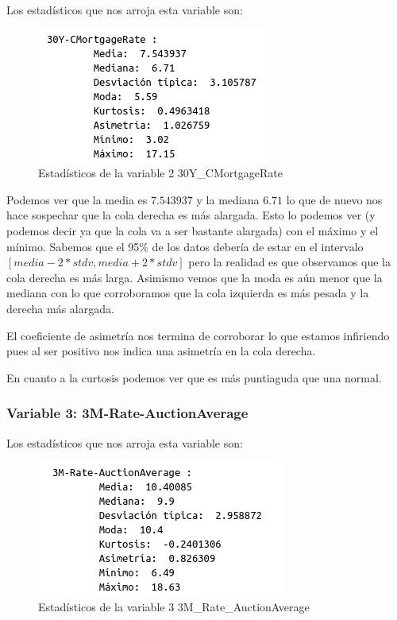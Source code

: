 \documentclass[12pt,a4paper]{article}
\begin{document}
Los estadísticos que nos arroja esta variable son:

\begin{figure}[H]
	\centering
	\includegraphics[scale=0.7]{./Imagenes/estadisticos_30Y_CMortgageRate.png}
	\caption{Estadísticos de la variable 2 30Y\_CMortgageRate}
\end{figure}

Podemos ver que la media es $7.543937$ y la mediana $6.71$ lo que de nuevo nos hace sospechar que la cola derecha es más alargada. Esto lo podemos ver (y podemos decir ya que la cola va a ser bastante alargada) con el máximo y el mínimo. Sabemos que el 95\% de los datos debería de estar en el intervalo $[ media-2*stdv, media+2*stdv ]$ pero la realidad es que observamos que la cola derecha es más larga. Asimismo vemos que la moda es aún menor que la mediana con lo que corroboramos que la cola izquierda es más pesada y la derecha más alargada.

El coeficiente de asimetría nos termina de corroborar lo que estamos infiriendo pues al ser positivo nos indica una asimetría en la cola derecha.

En cuanto a la curtosis podemos ver que es más puntiaguda que una normal.

\subsubsection*{Variable 3: 3M-Rate-AuctionAverage}

Los estadísticos que nos arroja esta variable son:

\begin{figure}[H]
	\centering
	\includegraphics[scale=0.7]{./Imagenes/estadisticos_3M_Rate_AuctionAverage.png}
	\caption{Estadísticos de la variable 3 3M\_Rate\_AuctionAverage}
\end{figure}
\end{document}

